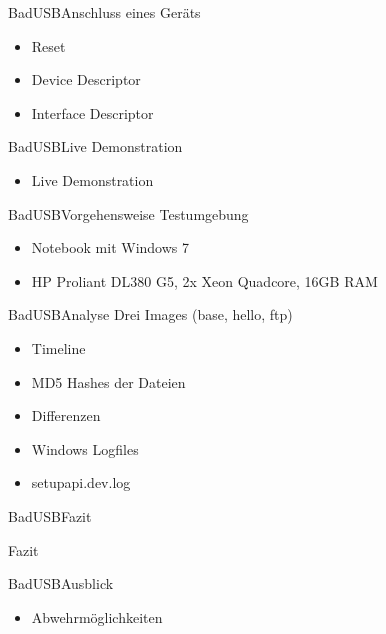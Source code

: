 \documentclass[xcolor=dvipsnames,pdftex]{beamer}
\begin{document}
\begin{frame}{BadUSB}{Anschluss eines Geräts}
	\begin{itemize}
        \item Reset
        \item Device Descriptor
        \item Interface Descriptor
	\end{itemize}
\end{frame}
\begin{frame}{BadUSB}{Live Demonstration}
	\begin{itemize}
        \item Live Demonstration
	\end{itemize}
\end{frame}
\begin{frame}{BadUSB}{Vorgehensweise}
    Testumgebung
	\begin{itemize}
        \item Notebook mit Windows 7
        \item HP Proliant DL380 G5, 2x Xeon Quadcore, 16GB RAM
	\end{itemize}
\end{frame}
\begin{frame}{BadUSB}{Analyse}
    Drei Images (base, hello, ftp)
	\begin{itemize}
        \item Timeline
        \item MD5 Hashes der Dateien 
        \item Differenzen
        \item Windows Logfiles
        \item setupapi.dev.log
	\end{itemize}
\end{frame}
\begin{frame}{BadUSB}{Fazit}
    \begin{centering}
        Fazit
    \end{centering}
\end{frame}

\begin{frame}{BadUSB}{Ausblick}
    \begin{itemize}
        \item Abwehrmöglichkeiten
    \end{itemize}
\end{frame}
\end{document}
